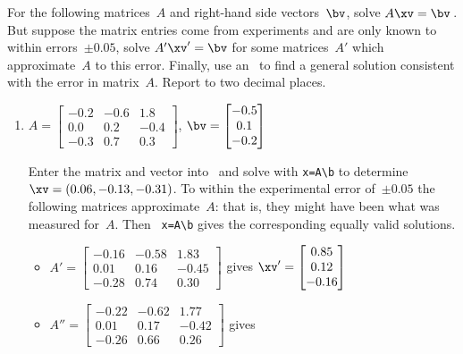 \begin{example} \label{eg:3regmat}
For the following matrices~\(A\) and right-hand side vectors~\(\bv\),
solve \(A\xv=\bv\)\,.
But suppose the matrix entries come from experiments and are only known to within errors~\(\pm0.05\),  solve \(A'\xv'=\bv\) for some matrices~\(A'\) which approximate~\(A\) to this error.
Finally, use an \svd\ to find a general solution consistent with the error in matrix~\(A\).
Report to two decimal places.
\begin{enumerate}
\item\label{eg:3regmata} \(A=\begin{bmatrix} -0.2&-0.6&1.8
\\ 0.0&0.2&-0.4
\\ -0.3&0.7&0.3 \end{bmatrix}\),
\(\bv=\begin{bmatrix} -0.5
\\ 0.1
\\ -0.2
 \end{bmatrix}\)
\begin{solution} 
Enter the matrix and vector into \script\ and solve with \verb|x=A\b| to determine \(\xv=(0.06,-0.13,-0.31)\).
\setbox\ajrqrbox\hbox{}%
\marginpar{\usebox{\ajrqrbox\\[2ex]}}%
To within the experimental error of~\(\pm0.05\) the following matrices approximate~\(A\): that is, they might have been what was measured for~\(A\).
Then \script\ \verb|x=A\b| gives the corresponding equally valid solutions.
\begin{itemize}
\item \(A'=\begin{bmatrix} -0.16&-0.58&1.83
\\ 0.01&0.16&-0.45
\\ -0.28&0.74&0.30 \end{bmatrix}\) gives
\(\xv'=\begin{bmatrix} 0.85\\0.12\\-0.16 \end{bmatrix}\)
\item \(A''=\begin{bmatrix} -0.22&-0.62&1.77
\\ 0.01&0.17&-0.42
\\ -0.26&0.66&0.26 \end{bmatrix}\) gives

\end{itemize}
\end{solution}
\end{enumerate}
\end{example}
